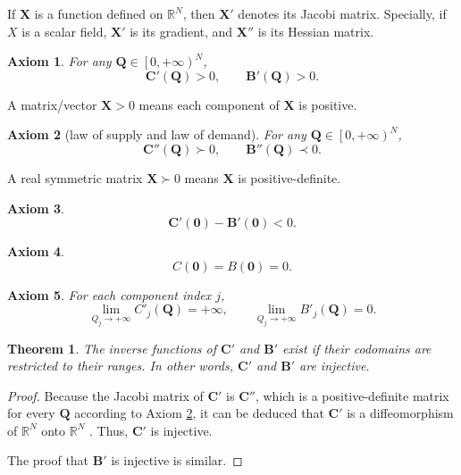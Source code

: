\documentclass{article}
\newtheorem{axiom}{Axiom}[subsection]
\newtheorem{theorem}{Theorem}[subsection]
\begin{document}
If $\mathbf X$ is a function defined on $\mathbb R^N$, then $\mathbf X'$ denotes its Jacobi matrix.
Specially, if $X$ is a scalar field, $\mathbf X'$ is its gradient, and $\mathbf X''$ is its Hessian matrix.

\begin{axiom}
\label{multi monoticity}
For any $\mathbf Q\in\left[0,+\infty\right)^N$,
$$\mathbf C'\left(\mathbf Q\right)>0,\qquad\mathbf B'\left(\mathbf Q\right)>0.$$
\end{axiom}

A matrix/vector $\mathbf X>0$ means each component of $\mathbf X$ is positive.

\begin{axiom}[law of supply and law of demand]
\label{multi law of supply and law of demand}
For any $\mathbf Q\in\left[0,+\infty\right)^N$,
$$\mathbf C''\left(\mathbf Q\right)\succ0,\qquad\mathbf B''\left(\mathbf Q\right)\prec0.$$
\end{axiom}

A real symmetric matrix $\mathbf X\succ0$ means $\mathbf X$ is positive-definite.

\begin{axiom}
$$\mathbf C'\left(\mathbf0\right)-\mathbf B'\left(\mathbf0\right)<0.$$
\end{axiom}

\begin{axiom}
$$C\left(\mathbf0\right)=B\left(\mathbf0\right)=0.$$
\end{axiom}

\begin{axiom}
For each component index $j$,
$$\lim_{Q_j\to+\infty}C'_j\left(\mathbf Q\right)=+\infty,
\qquad\lim_{Q_j\to+\infty}B'_j\left(\mathbf Q\right)=0.$$
\end{axiom}

\begin{theorem}
The inverse functions of $\mathbf C'$ and $\mathbf B'$ exist if their codomains are restricted to their ranges.
In other words, $\mathbf C'$ and $\mathbf B'$ are injective.
\end{theorem}
\begin{proof}
Because the Jacobi matrix of $\mathbf C'$ is $\mathbf C''$,
which is a positive-definite matrix for every $\mathbf Q$ according to Axiom \ref{multi law of supply and law of demand},
it can be deduced that $\mathbf C'$ is a diffeomorphism of $\mathbb R^N$ onto $\mathbb R^N$ \cite{diffeomorphism}.
Thus, $\mathbf C'$ is injective.

The proof that $\mathbf B'$ is injective is similar.
\end{proof}
\end{document}
